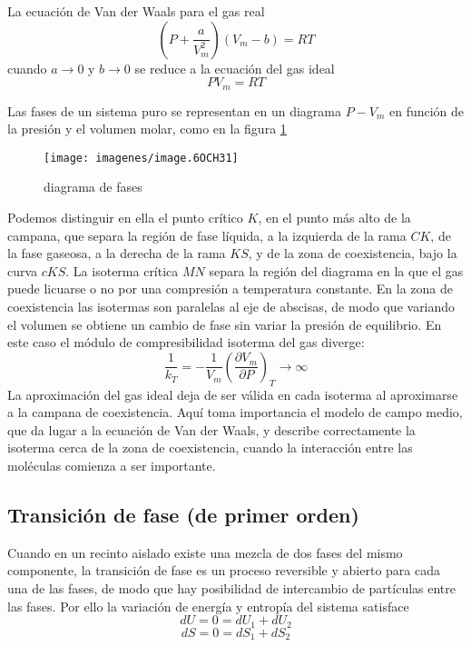 \documentclass[a4paper,12pt,spanish]{article}
\begin{document}
	
	
	La ecuación de Van der Waals para el gas real
	\[\left(P + \frac{a}{V_m^2}\right)(V_m - b) = RT
	\]
	cuando $a \rightarrow 0$  y $b \rightarrow 0$ se reduce a la ecuación del gas ideal
	\[PV_m = RT\]
	


	Las fases de un sistema puro se representan en un diagrama $P - V_m$ en función de la presión y el volumen molar, como en la figura \ref{fig:diagrama}
	
	\begin{figure}[H]
		\centering
		\texttt{[image: imagenes/image.6OCH31]}
		\caption{diagrama de fases}
		\label{fig:diagrama}
	\end{figure}
	
	
	Podemos distinguir en ella el punto crítico $K$, en el punto más alto de la campana, que separa la región de fase líquida, a la izquierda de la rama $CK$, de la fase gaseosa, a la derecha de la rama $KS$, y de la zona de coexistencia, bajo la curva $cKS$.
	La isoterma crítica $MN$ separa la región del diagrama en la que el gas puede licuarse o no por una compresión a temperatura constante. 
	En la zona de coexistencia las isotermas son paralelas al eje de abscisas, de modo que variando el volumen se obtiene un cambio de fase sin variar la presión de equilibrio. En este caso el módulo de compresibilidad isoterma del gas diverge:
	\[ \frac{1}{k_T} = -\frac{1}{V_m} \left(\frac{\partial V_m}{\partial P}\right)_T \rightarrow \infty
 	\]
	La aproximación del gas ideal deja de ser válida en cada isoterma al aproximarse a la campana de coexistencia. Aquí toma importancia el modelo de campo medio, que da lugar a la ecuación de Van der Waals, y describe correctamente la isoterma cerca de la zona de coexistencia, cuando la interacción entre las moléculas comienza a ser importante.
	
	
	\subsection*{Transición de fase (de primer orden)}
	
	
	Cuando en un recinto aislado existe una mezcla de dos fases del mismo componente, la transición de fase es un proceso reversible y abierto para cada una de las fases, de modo que hay posibilidad de intercambio de partículas entre las fases. Por ello la variación de energía y entropía del sistema satisface 
	\[ dU = 0 = dU_1 + dU_2
	\]
	\[ dS = 0 = dS_1 + dS_2
	\]
	
\end{document}
